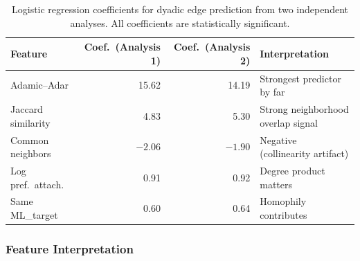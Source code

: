 \documentclass[letterpaper]{article}
\begin{document}
\begin{table}[H]
  \centering
  \begin{tabular}{lrrl}
    \toprule
    \textbf{Feature} & \textbf{Coef.\ (Analysis 1)} & \textbf{Coef.\ (Analysis 2)} & \textbf{Interpretation} \\
    \midrule
    Adamic--Adar        & 15.62 & 14.19 & Strongest predictor by far \\
    Jaccard similarity  & 4.83  & 5.30  & Strong neighborhood overlap signal \\
    Common neighbors    & $-2.06$ & $-1.90$ & Negative (collinearity artifact) \\
    Log pref.\ attach.  & 0.91  & 0.92  & Degree product matters \\
    Same ML\_target      & 0.60  & 0.64  & Homophily contributes \\
    \bottomrule
  \end{tabular}
  \caption{Logistic regression coefficients for dyadic edge prediction from two independent analyses. All coefficients are statistically significant.}
  \label{tab:dyadic_logistic}
\end{table}

\subsubsection{Feature Interpretation}
\end{document}
